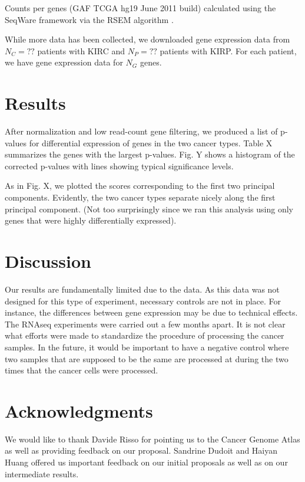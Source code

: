 Counts per genes (GAF TCGA hg19 June 2011 build) calculated using the SeqWare
framework via the RSEM algorithm \cite{li2011rsem}.

While more data has been collected, we downloaded gene expression data from
$N_C =??$ patients with KIRC and $N_P = ??$ patients with KIRP.  For each
patient, we have gene expression data for $N_G$ genes. 

\section{Results}

After normalization and low read-count gene filtering, we produced a list of
p-values for differential expression of genes in the two cancer types. Table X
summarizes the genes with the largest p-values. Fig. Y shows a histogram of the
corrected p-values with lines showing typical significance levels. 

As in Fig. X, we plotted the scores corresponding to the first two principal
components. Evidently, the two cancer types separate nicely along the first
principal component. (Not too surprisingly since we ran this analysis using
only genes that were highly differentially expressed).  


\section{Discussion}

Our results are fundamentally limited due to the data. As this data was not
designed for this type of experiment, necessary controls are not in place. For
instance, the differences between gene expression may be due to technical
effects. The RNAseq experiments were carried out a few months apart. It is not
clear what efforts were made to standardize the procedure of processing the
cancer samples. In the future, it would be important to have a negative control
where two samples that are supposed to be the same are processed at during the
two times that the cancer cells were processed. 

\section*{Acknowledgments}

We would like to thank Davide Risso for pointing us to the Cancer Genome Atlas
as well as providing feedback on our proposal. Sandrine Dudoit and Haiyan Huang
offered us important feedback on our initial proposals as well as on our
intermediate results. 




